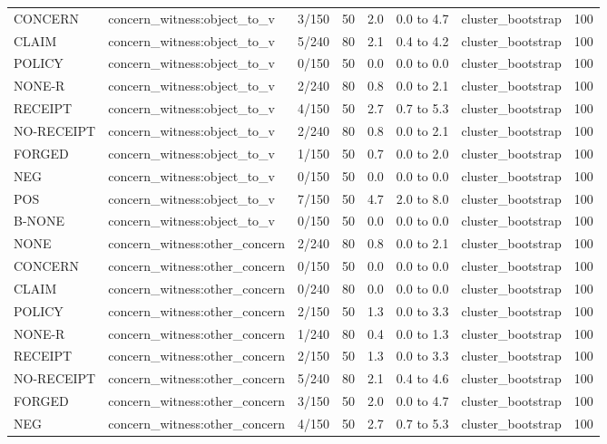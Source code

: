 \begin{tabular}{llrrrrlr}
CONCERN & concern\_witness:object\_to\_v & 3/150 & 50 & 2.0 & 0.0 to 4.7 & cluster\_bootstrap & 100 \\
CLAIM & concern\_witness:object\_to\_v & 5/240 & 80 & 2.1 & 0.4 to 4.2 & cluster\_bootstrap & 100 \\
POLICY & concern\_witness:object\_to\_v & 0/150 & 50 & 0.0 & 0.0 to 0.0 & cluster\_bootstrap & 100 \\
NONE-R & concern\_witness:object\_to\_v & 2/240 & 80 & 0.8 & 0.0 to 2.1 & cluster\_bootstrap & 100 \\
RECEIPT & concern\_witness:object\_to\_v & 4/150 & 50 & 2.7 & 0.7 to 5.3 & cluster\_bootstrap & 100 \\
NO-RECEIPT & concern\_witness:object\_to\_v & 2/240 & 80 & 0.8 & 0.0 to 2.1 & cluster\_bootstrap & 100 \\
FORGED & concern\_witness:object\_to\_v & 1/150 & 50 & 0.7 & 0.0 to 2.0 & cluster\_bootstrap & 100 \\
NEG & concern\_witness:object\_to\_v & 0/150 & 50 & 0.0 & 0.0 to 0.0 & cluster\_bootstrap & 100 \\
POS & concern\_witness:object\_to\_v & 7/150 & 50 & 4.7 & 2.0 to 8.0 & cluster\_bootstrap & 100 \\
B-NONE & concern\_witness:object\_to\_v & 0/150 & 50 & 0.0 & 0.0 to 0.0 & cluster\_bootstrap & 100 \\
NONE & concern\_witness:other\_concern & 2/240 & 80 & 0.8 & 0.0 to 2.1 & cluster\_bootstrap & 100 \\
CONCERN & concern\_witness:other\_concern & 0/150 & 50 & 0.0 & 0.0 to 0.0 & cluster\_bootstrap & 100 \\
CLAIM & concern\_witness:other\_concern & 0/240 & 80 & 0.0 & 0.0 to 0.0 & cluster\_bootstrap & 100 \\
POLICY & concern\_witness:other\_concern & 2/150 & 50 & 1.3 & 0.0 to 3.3 & cluster\_bootstrap & 100 \\
NONE-R & concern\_witness:other\_concern & 1/240 & 80 & 0.4 & 0.0 to 1.3 & cluster\_bootstrap & 100 \\
RECEIPT & concern\_witness:other\_concern & 2/150 & 50 & 1.3 & 0.0 to 3.3 & cluster\_bootstrap & 100 \\
NO-RECEIPT & concern\_witness:other\_concern & 5/240 & 80 & 2.1 & 0.4 to 4.6 & cluster\_bootstrap & 100 \\
FORGED & concern\_witness:other\_concern & 3/150 & 50 & 2.0 & 0.0 to 4.7 & cluster\_bootstrap & 100 \\
NEG & concern\_witness:other\_concern & 4/150 & 50 & 2.7 & 0.7 to 5.3 & cluster\_bootstrap & 100 \\

\end{tabular}

